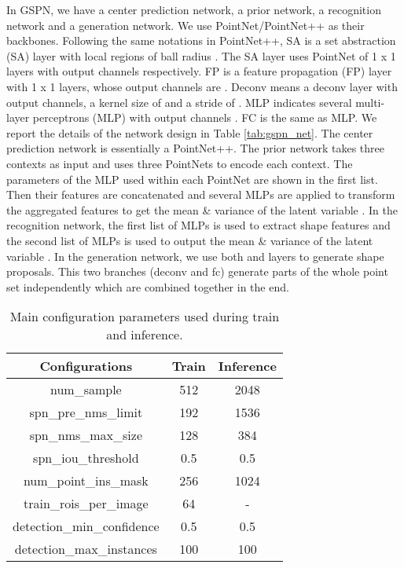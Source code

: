 \documentclass[10pt,twocolumn,letterpaper]{article}
\begin{document}
In GSPN, we have a center prediction network, a prior network, a recognition network and a generation network. We use PointNet/PointNet++ as their backbones. Following the same notations in PointNet++, SA is a set abstraction (SA) layer with  local regions of ball radius . The SA layer uses PointNet of  1 x 1  layers with output channels  respectively. FP is a feature propagation (FP) layer with  1 x 1  layers, whose output channels are . Deconv means a deconv layer with  output channels, a kernel size of  and a stride of . MLP indicates several multi-layer perceptrons (MLP) with output channels . FC is the same as MLP. We report the details of the network design in Table \ref{tab:gspn_net}. The center prediction network is essentially a PointNet++. The prior network takes three contexts as input and uses three PointNets to encode each context. The parameters of the MLP used within each PointNet are shown in the first list. Then their features are concatenated and several MLPs are applied to transform the aggregated features to get the mean \& variance of the latent variable . In the recognition network, the first list of MLPs is used to extract shape features and the second list of MLPs is used to output the mean \& variance of the latent variable . In the generation network, we use both  and  layers to generate shape proposals. This two branches (deconv and fc) generate parts of the whole point set independently which are combined together in the end.

\begin{table}[h]
    \centering
    \begin{tabular}{c|c|c}
    \toprule
        Configurations & Train & Inference \\
    \midrule
        num\_sample & 512 & 2048 \\
        spn\_pre\_nms\_limit & 192 & 1536 \\
        spn\_nms\_max\_size & 128 & 384 \\
        spn\_iou\_threshold & 0.5 & 0.5 \\
        num\_point\_ins\_mask & 256 & 1024 \\
        train\_rois\_per\_image & 64 & - \\
        detection\_min\_confidence & 0.5 & 0.5 \\
        detection\_max\_instances & 100 & 100 \\
    \bottomrule 
    \end{tabular}
    \caption{Main configuration parameters used during train and inference.}
    \label{tab:config}
\end{table}
\end{document}
